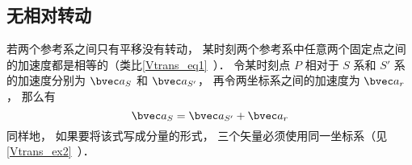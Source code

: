 

\subsection{无相对转动}
若两个参考系之间只有平移没有转动， 某时刻两个参考系中任意两个固定点之间的加速度都是相等的（类比\autoref{Vtrans_eq1}~）． 令某时刻点 $P$ 相对于 $S$ 系和 $S'$ 系的加速度分别为 $\bvec a_S$ 和 $\bvec a_{S'}$， 再令两坐标系之间的加速度为 $\bvec a_r$， 那么有
\begin{equation}\label{AccTra_eq1}
\bvec a_S = \bvec a_{S'} + \bvec a_r
\end{equation}
同样地， 如果要将该式写成分量的形式， 三个矢量必须使用同一坐标系（见\autoref{Vtrans_ex2}~）．


